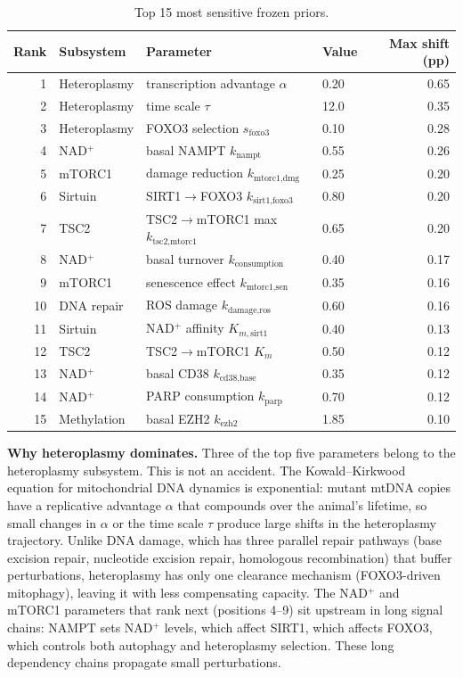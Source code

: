 \documentclass[11pt]{article}
\begin{document}
\begin{table}[H]
\centering
\caption{Top 15 most sensitive frozen priors.}
\label{tab:oat_top15}
\begin{tabular}{@{}rlllr@{}}
\toprule
Rank & Subsystem & Parameter & Value & Max shift (pp) \\
\midrule
1 & Heteroplasmy & transcription advantage $\alpha$ & 0.20 & 0.65 \\
2 & Heteroplasmy & time scale $\tau$ & 12.0 & 0.35 \\
3 & Heteroplasmy & FOXO3 selection $s_{\text{foxo3}}$ & 0.10 & 0.28 \\
4 & NAD$^+$ & basal NAMPT $k_{\text{nampt}}$ & 0.55 & 0.26 \\
5 & mTORC1 & damage reduction $k_{\text{mtorc1,dmg}}$ & 0.25 & 0.20 \\
6 & Sirtuin & SIRT1$\to$FOXO3 $k_{\text{sirt1,foxo3}}$ & 0.80 & 0.20 \\
7 & TSC2 & TSC2$\to$mTORC1 max $k_{\text{tsc2,mtorc1}}$ & 0.65 & 0.20 \\
8 & NAD$^+$ & basal turnover $k_{\text{consumption}}$ & 0.40 & 0.17 \\
9 & mTORC1 & senescence effect $k_{\text{mtorc1,sen}}$ & 0.35 & 0.16 \\
10 & DNA repair & ROS damage $k_{\text{damage,ros}}$ & 0.60 & 0.16 \\
11 & Sirtuin & NAD$^+$ affinity $K_{m,\text{sirt1}}$ & 0.40 & 0.13 \\
12 & TSC2 & TSC2$\to$mTORC1 $K_m$ & 0.50 & 0.12 \\
13 & NAD$^+$ & basal CD38 $k_{\text{cd38,base}}$ & 0.35 & 0.12 \\
14 & NAD$^+$ & PARP consumption $k_{\text{parp}}$ & 0.70 & 0.12 \\
15 & Methylation & basal EZH2 $k_{\text{ezh2}}$ & 1.85 & 0.10 \\
\bottomrule
\end{tabular}
\end{table}

\textbf{Why heteroplasmy dominates.} Three of the top five parameters belong to the heteroplasmy subsystem. This is not an accident. The Kowald--Kirkwood equation for mitochondrial DNA dynamics is exponential: mutant mtDNA copies have a replicative advantage $\alpha$ that compounds over the animal's lifetime, so small changes in $\alpha$ or the time scale $\tau$ produce large shifts in the heteroplasmy trajectory. Unlike DNA damage, which has three parallel repair pathways (base excision repair, nucleotide excision repair, homologous recombination) that buffer perturbations, heteroplasmy has only one clearance mechanism (FOXO3-driven mitophagy), leaving it with less compensating capacity. The NAD$^+$ and mTORC1 parameters that rank next (positions 4--9) sit upstream in long signal chains: NAMPT sets NAD$^+$ levels, which affect SIRT1, which affects FOXO3, which controls both autophagy and heteroplasmy selection. These long dependency chains propagate small perturbations.
\end{document}

